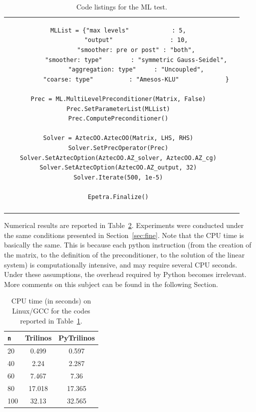 \documentclass[acmtocl]{acmtrans2m}
\begin{document}
\begin{table}
\begin{tabular}{| c  | c|}
\begin{minipage}{10.5cm}
\begin{verbatim}
MLList = {"max levels"            : 5,
          "output"                : 10,
          "smoother: pre or post" : "both",
          "smoother: type"        : "symmetric Gauss-Seidel",
          "aggregation: type"     : "Uncoupled",
          "coarse: type"          : "Amesos-KLU"             }

Prec = ML.MultiLevelPreconditioner(Matrix, False)
Prec.SetParameterList(MLList)
Prec.ComputePreconditioner()

Solver = AztecOO.AztecOO(Matrix, LHS, RHS)
Solver.SetPrecOperator(Prec)
Solver.SetAztecOption(AztecOO.AZ_solver, AztecOO.AZ_cg)
Solver.SetAztecOption(AztecOO.AZ_output, 32)
Solver.Iterate(500, 1e-5)

Epetra.Finalize()
\end{verbatim}
    \end{minipage}
    \\
    &  \\
    \hline
  \end{tabular}
  \caption{Code listings for the ML test.}
  \label{tab:code_ml}
\end{table}

Numerical results are reported in Table~\ref{tab:time_ml}. Experiments
were conducted under the same conditions presented in
Section~\ref{sec:fine}. Note that the CPU time is basically the
same. This is because each python instruction (from the creation of
the matrix, to the definition of the preconditioner, to the solution
of the linear system) is computationally intensive, and may require
several CPU seconds. Under these assumptions, the overhead required by
Python becomes irrelevant. More comments on this subject can be found
in the following Section.

\begin{table}
  \begin{center}
    \begin{tabular}{| l | c | c |}
      \hline
      \tt n & Trilinos & PyTrilinos \\
      \hline
      20  & 0.499  & 0.597  \\
      40  & 2.24   & 2.287  \\
      60  & 7.467  & 7.36   \\
      80  & 17.018 & 17.365 \\
      100 & 32.13  & 32.565 \\
      \hline
    \end{tabular}
    \caption{CPU time (in seconds) on Linux/GCC for the codes reported
      in Table~\ref{tab:code_ml}.}
    \label{tab:time_ml}
  \end{center}
\end{table}
\end{document}
